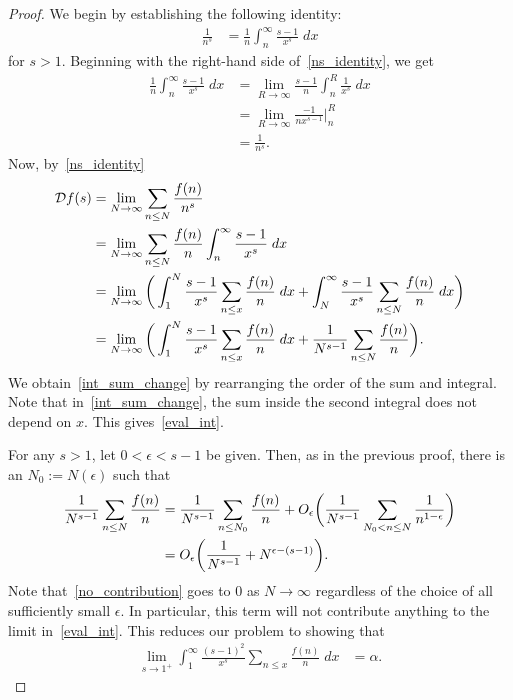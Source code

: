 \documentclass[11pt]{article}
\begin{document}
\begin{proof}
We begin by establishing the following identity:
\begin{align}
\frac{1}{n^s} &= \frac{1}{n}\int_n^\infty\frac{s-1}{x^s}\;dx\label{ns_identity}
\end{align}
for $s>1$.
Beginning with the right-hand side of~\eqref{ns_identity}, we get
\begin{align*}
\frac{1}{n}\int_n^\infty\frac{s-1}{x^s}\;dx &= \lim_{R\to\infty}\frac{s-1}{n}\int_n^R\frac{1}{x^s}\;dx\\
&= \lim_{R\to\infty}\frac{-1}{nx^{s-1}}\Big|_n^R\\
&= \frac{1}{n^s}.
\end{align*}
Now, by~\eqref{ns_identity}
\begin{align}
\mathcal{D}f(s) &= \lim_{N\to\infty} \sum_{n\leq N}\frac{f(n)}{n^s}\notag\\
&= \lim_{N\to\infty} \sum_{n\leq N}\frac{f(n)}{n}\int_n^\infty\frac{s-1}{x^s}\;dx\notag\\
&= \lim_{N\to\infty} \bigg(\int_1^N\frac{s-1}{x^s}\sum_{n\leq x}\frac{f(n)}{n}\;dx+\int_N^\infty\frac{s-1}{x^s}\sum_{n\leq N}\frac{f(n)}{n}\;dx\bigg)\label{int_sum_change}\\
&= \lim_{N\to\infty} \bigg(\int_1^N\frac{s-1}{x^s}\sum_{n\leq x}\frac{f(n)}{n}\;dx+\frac{1}{N^{s-1}}\sum_{n\leq N}\frac{f(n)}{n}\bigg)\label{eval_int}.
\end{align}
We obtain~\eqref{int_sum_change} by rearranging the order of the sum and integral. Note that in~\eqref{int_sum_change}, the sum inside the second integral does not depend on $x$. This gives~\eqref{eval_int}.

For any $s>1$, let $0<\epsilon<s-1$ be given. Then, as in the previous proof, there is an $N_0:=N(\epsilon)$ such that
\begin{align}
\frac{1}{N^{s-1}}\sum_{n\leq N}\frac{f(n)}{n} &= \frac{1}{N^{s-1}}\sum_{n\leq N_0}\frac{f(n)}{n}+O_\epsilon\bigg(\frac{1}{N^{s-1}}\sum_{N_0<n\leq N}\frac{1}{n^{1-\epsilon}}\bigg)\notag\\
&= O_\epsilon\bigg(\frac{1}{N^{s-1}}+N^{\epsilon-(s-1)}\bigg).\label{no_contribution}
\end{align}
Note that~\eqref{no_contribution} goes to 0 as $N\to\infty$ regardless of the choice of all sufficiently small $\epsilon$. In particular, this term will not contribute anything to the limit in~\eqref{eval_int}. This reduces our problem to showing that
\begin{align*}
\lim_{s\to1^+}\int_1^\infty\frac{(s-1)^2}{x^s}\sum_{n\leq x}\frac{f(n)}{n}\;dx &= \alpha.
\end{align*}


\end{proof}
\end{document}
